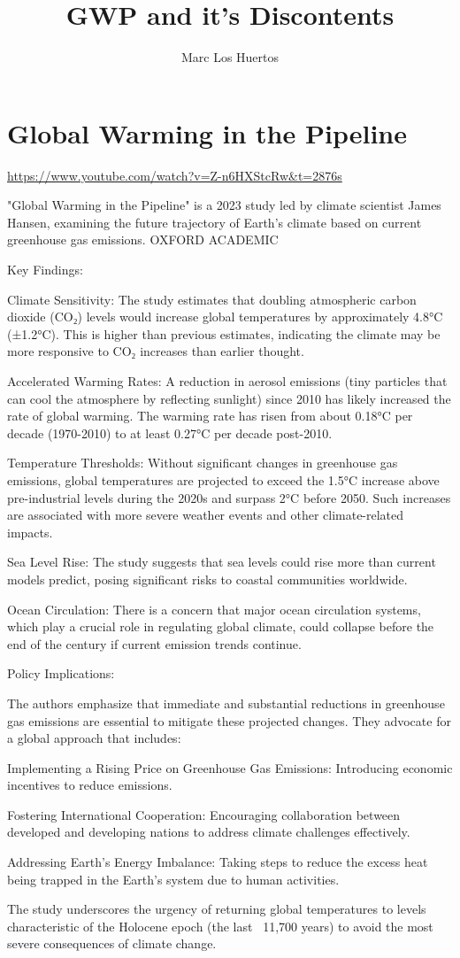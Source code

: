 \documentclass{tufte-handout}\usepackage[]{graphicx}\usepackage[]{xcolor}
\title{GWP and it's Discontents}
\author{Marc Los Huertos}
\begin{document}
\maketitle

\section{Global Warming in the Pipeline}

\url{https://www.youtube.com/watch?v=Z-n6HXStcRw&t=2876s}

"Global Warming in the Pipeline" is a 2023 study led by climate scientist James Hansen, examining the future trajectory of Earth's climate based on current greenhouse gas emissions. 
OXFORD ACADEMIC

Key Findings:

Climate Sensitivity: The study estimates that doubling atmospheric carbon dioxide (CO₂) levels would increase global temperatures by approximately 4.8°C (±1.2°C). This is higher than previous estimates, indicating the climate may be more responsive to CO₂ increases than earlier thought. 


Accelerated Warming Rates: A reduction in aerosol emissions (tiny particles that can cool the atmosphere by reflecting sunlight) since 2010 has likely increased the rate of global warming. The warming rate has risen from about 0.18°C per decade (1970-2010) to at least 0.27°C per decade post-2010. 


Temperature Thresholds: Without significant changes in greenhouse gas emissions, global temperatures are projected to exceed the 1.5°C increase above pre-industrial levels during the 2020s and surpass 2°C before 2050. Such increases are associated with more severe weather events and other climate-related impacts. 


Sea Level Rise: The study suggests that sea levels could rise more than current models predict, posing significant risks to coastal communities worldwide. 


Ocean Circulation: There is a concern that major ocean circulation systems, which play a crucial role in regulating global climate, could collapse before the end of the century if current emission trends continue. 


Policy Implications:

The authors emphasize that immediate and substantial reductions in greenhouse gas emissions are essential to mitigate these projected changes. They advocate for a global approach that includes:

Implementing a Rising Price on Greenhouse Gas Emissions: Introducing economic incentives to reduce emissions.

Fostering International Cooperation: Encouraging collaboration between developed and developing nations to address climate challenges effectively.

Addressing Earth's Energy Imbalance: Taking steps to reduce the excess heat being trapped in the Earth's system due to human activities.

The study underscores the urgency of returning global temperatures to levels characteristic of the Holocene epoch (the last ~11,700 years) to avoid the most severe consequences of climate change.
	
\end{document}
